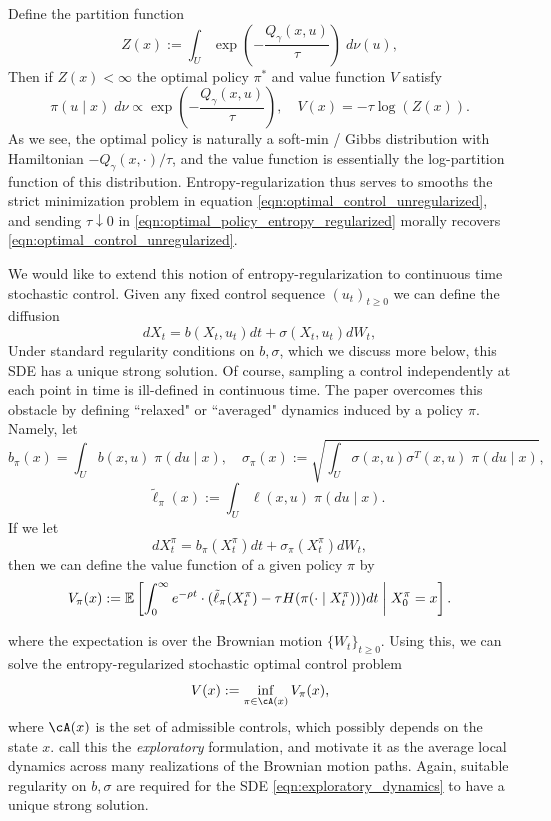 %
\noindent Define the partition function
%
\[Z(x) := \int_U \exp\left(-\frac{Q_\gamma(x,u)}{\tau}\right) \; d\nu(u),\]
%
\noindent Then if $Z(x) < \infty$  the optimal policy $\pi^*$ and value function $V$ satisfy
%
\begin{equation}
	\pi(u \mid x) \; d\nu \propto \exp\left(-\frac{Q_\gamma(x,u)}{\tau} \right), \quad V(x) = -\tau \log(Z(x)).
	\label{eqn:optimal_policy_entropy_regularized}
\end{equation}
%
\noindent As we see, the optimal policy is naturally a soft-min / Gibbs distribution with Hamiltonian $-Q_\gamma(x, \cdot ) / \tau$, and the value function
is essentially the log-partition function of this distribution. Entropy-regularization thus serves to smooths
the strict minimization problem in equation \eqref{eqn:optimal_control_unregularized}, and sending $\tau \downarrow 0$ in \eqref{eqn:optimal_policy_entropy_regularized}
morally recovers \eqref{eqn:optimal_control_unregularized}.

 We would like to extend this notion of entropy-regularization to continuous time stochastic control. Given any fixed control sequence $(u_t)_{t \geq 0}$ we can define the diffusion
%
\[dX_t = b(X_t, u_t) dt + \sigma(X_t, u_t) dW_t,\]
%
Under standard regularity conditions on $b, \sigma$, which we discuss more below, this SDE has a unique strong solution. Of course, sampling a control independently at each point in time is ill-defined in continuous time.
The paper \cite{wang2020_reinforcement_learning_stochastic_control} overcomes this obstacle by defining ``relaxed" or ``averaged" dynamics induced by a policy $\pi$. Namely, let
%
	\[b_\pi(x) = \int_U b(x, u) \;\pi(du \mid x), \quad \sigma_\pi(x) := \sqrt{\int_U \sigma(x, u) \sigma^T(x,u) \;\pi(du \mid x)}, \]
	\[\quad \tilde{\ell}_\pi(x) := \int_U \ell(x, u) \; \pi(du \mid x).\]
%
If we let
%
\begin{equation}
	dX^\pi_t = b_\pi(X^\pi_t) dt + \sigma_\pi(X^\pi_t) dW_t,
	\label{eqn:exploratory_dynamics}
\end{equation}
%
\noindent then we can define the value function of a given policy $\pi$ by
%
\begin{equation}
	V_\pi(x) := \mathbb{E}\left[ \int_0^\infty e^{-\rho t} \cdot (\tilde{\ell}_\pi(X^\pi_t) - \tau H(\pi(\cdot \mid X^\pi_t))) dt\;\bigg\vert\; X^\pi_0 = x\right].
	\label{eqn:exploratory_value_function}
\end{equation}

\noindent where the expectation is over the Brownian motion $\{W_t\}_{t \geq 0}$. Using this, we can solve the entropy-regularized stochastic optimal control problem
%
\begin{equation}
	V(x) := \inf_{\pi \in \cA(x)} V_\pi(x),
	\label{eqn:exploratory_optimal_value_function}
\end{equation}
%
\noindent  where $\cA(x)$ is the set of admissible controls, which possibly depends on the state $x$. \cite{wang2020_reinforcement_learning_stochastic_control} call this the \textit{exploratory} formulation, and motivate it as the average local dynamics
across many realizations of the Brownian motion paths. Again, suitable regularity on $b, \sigma$ are required for the SDE \ref{eqn:exploratory_dynamics} to have a unique strong solution.


